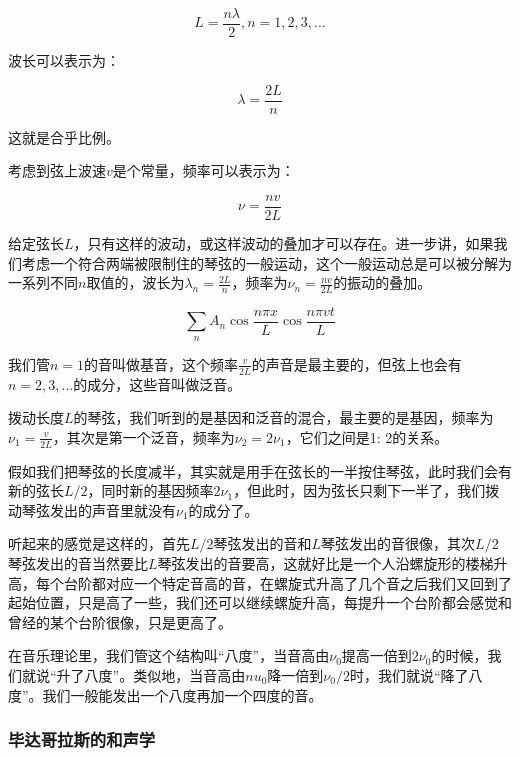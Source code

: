 \begin{equation}
L = \frac{n \lambda}{2}, n = 1, 2, 3, ...
\end{equation}

波长可以表示为：

\begin{equation}
\lambda = \frac{2L}{n}
\end{equation}

这就是合乎比例。

考虑到弦上波速$v$是个常量，频率可以表示为：

\begin{equation}
\nu = \frac{n v}{2 L }
\end{equation}

给定弦长$L$，只有这样的波动，或这样波动的叠加才可以存在。进一步讲，如果我们考虑一个符合两端被限制住的琴弦的一般运动，这个一般运动总是可以被分解为一系列不同$n$取值的，波长为$\lambda_n = \frac{2L}{n}$，频率为$\nu_n = \frac{n v}{2 L }$的振动的叠加。

\begin{equation}
\sum\limits_{n} A_n \cos \frac{n \pi x}{L} \cos \frac{n \pi vt}{L}
\end{equation}

我们管$n = 1$的音叫做基音，这个频率$\frac{v}{2L}$的声音是最主要的，但弦上也会有$n= 2, 3, ...$的成分，这些音叫做泛音。

拨动长度$L$的琴弦，我们听到的是基因和泛音的混合，最主要的是基因，频率为$\nu_1 = \frac{v}{2L} $，其次是第一个泛音，频率为$\nu_2 = 2 \nu_1$，它们之间是1: 2的关系。

假如我们把琴弦的长度减半，其实就是用手在弦长的一半按住琴弦，此时我们会有新的弦长$L/2$，同时新的基因频率$2 \nu_1$，但此时，因为弦长只剩下一半了，我们拨动琴弦发出的声音里就没有$\nu_1$的成分了。

听起来的感觉是这样的，首先$L/2$琴弦发出的音和$L$琴弦发出的音很像，其次$L/2$琴弦发出的音当然要比$L$琴弦发出的音要高，这就好比是一个人沿螺旋形的楼梯升高，每个台阶都对应一个特定音高的音，在螺旋式升高了几个音之后我们又回到了起始位置，只是高了一些，我们还可以继续螺旋升高，每提升一个台阶都会感觉和曾经的某个台阶很像，只是更高了。

在音乐理论里，我们管这个结构叫“八度”，当音高由$\nu_0$提高一倍到$2 \nu_0$的时候，我们就说“升了八度”。类似地，当音高由$nu_0$降一倍到$\nu_0 /2$时，我们就说“降了八度”。我们一般能发出一个八度再加一个四度的音。

\subsubsection{毕达哥拉斯的和声学}

